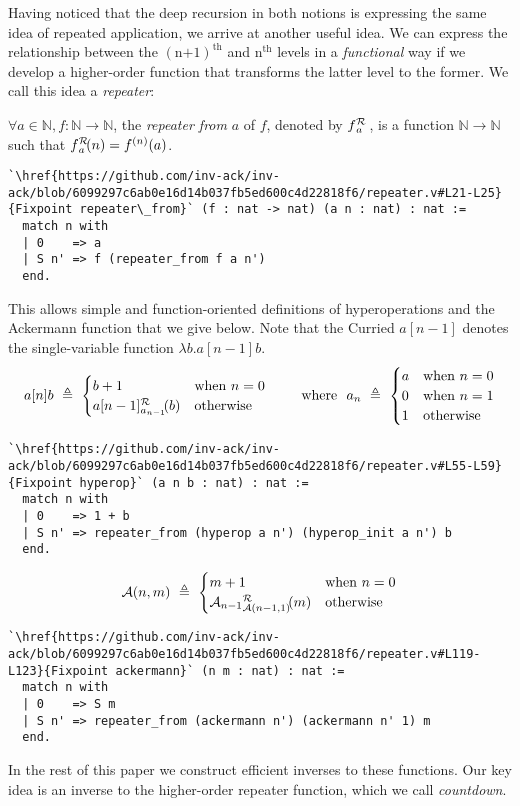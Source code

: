 Having noticed that the deep recursion in both notions is expressing the same idea
of repeated application, we arrive at another useful idea. We can express the relationship
between the $(\text{n+1})^{\text{th}}$ and $\text{n}^{\text{th}}$ levels in
a \emph{functional} way if we develop a higher-order function that transforms the latter level
to the former.  We call this idea a \emph{repeater}:
\begin{defn}
$\forall a\in \mathbb{N}, f: \mathbb{N}\to \mathbb{N}$, the \emph{repeater from} $a$ of $f$, denoted by $\rf{f}{a}$ , is a function $\mathbb{N}\to \mathbb{N}$ such that $\rf{f}{a}(n) = f^{(n)}(a)$.
\begin{lstlisting}
`\href{https://github.com/inv-ack/inv-ack/blob/6099297c6ab0e16d14b037fb5ed600c4d22818f6/repeater.v#L21-L25}{Fixpoint repeater\_from}` (f : nat -> nat) (a n : nat) : nat :=
  match n with
  | 0    => a
  | S n' => f (repeater_from f a n')
  end.
\end{lstlisting}
\end{defn}
This allows simple and function-oriented definitions of hyperoperations and the 
Ackermann function that we give below. Note that the Curried $a[n-1]$ denotes 
the single-variable function $\lambda b.a[n-1]b$.
\begin{equation*}
a[n]b ~ \triangleq ~ \begin{cases}
b + 1 & \text{when } n = 0 \\
\rf{a[n-1]}{a_{n-1}}(b) & \text{otherwise}
\end{cases}
\qquad \text{ where } \ a_n ~ \triangleq ~ \begin{cases}
a & \text{when } n = 0 \\
0 & \text{when } n = 1 \\
1 & \text{otherwise}
\end{cases}
\end{equation*}
\begin{lstlisting}
`\href{https://github.com/inv-ack/inv-ack/blob/6099297c6ab0e16d14b037fb5ed600c4d22818f6/repeater.v#L55-L59}{Fixpoint hyperop}` (a n b : nat) : nat :=
  match n with
  | 0    => 1 + b
  | S n' => repeater_from (hyperop a n') (hyperop_init a n') b
  end.
\end{lstlisting}
\begin{equation*}
\Ack(n,m) ~ \triangleq ~ \begin{cases}
m + 1 & \text{when } n = 0 \\
\rf{\Ack_{n-1}}{\Ack(n-1,1)}(m) & \text{otherwise}
\end{cases}
\end{equation*}
\begin{lstlisting}
`\href{https://github.com/inv-ack/inv-ack/blob/6099297c6ab0e16d14b037fb5ed600c4d22818f6/repeater.v#L119-L123}{Fixpoint ackermann}` (n m : nat) : nat :=
  match n with
  | 0    => S m
  | S n' => repeater_from (ackermann n') (ackermann n' 1) m
  end.
\end{lstlisting}
In the rest of this paper we construct efficient inverses to these
functions.  Our key idea is an inverse to the higher-order repeater function, which we call \emph{countdown}.

